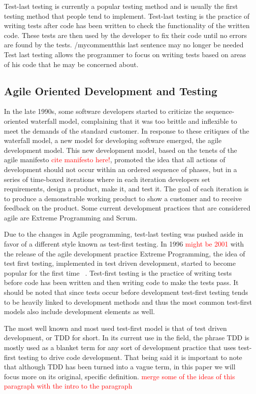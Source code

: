 \documentclass{sig-alternate}
\newcommand{\mycomment}[1]{\textcolor{red}{#1}}
\begin{document}
Test-last testing is currently a popular testing method and is usually the first testing method that people tend to implement.  Test-last testing is the practice of writing tests after code has been written to check the functionality of the written code.  These tests are then used by the developer to fix their code until no errors are found by the tests.  /mycomment{this last sentence may no longer be needed} Test last testing allows the programmer to focus on writing tests based on areas of his code that he may be concerned about.

\subsection{Agile Oriented Development and Testing}

In the late 1990s, some software developers started to criticize the sequence-oriented waterfall model, complaining that it was too brittle and inflexible to meet the demands of the standard customer.  In response to these critiques of the waterfall model, a new model for developing software emerged, the agile development model.  This new development model, based on the tenets of the agile manifesto \mycomment{cite manifesto here!}, promoted the idea that all actions of development should not occur within an ordered sequence of phases, but in a series of time-boxed iterations where in each iteration developers set requirements, design a product, make it, and test it.  The goal of each iteration is to produce a demonstrable working product to show a customer and to receive feedback on the product.  Some current development practices that are considered agile are Extreme Programming and Scrum.

Due to the changes in Agile programming, test-last testing was pushed aside in favor of a different style known as test-first testing.  In 1996 \mycomment{might be 2001} with the release of the agile development practice Extreme Programming, the idea of test first testing, implemented in test driven development, started to become popular for the first time ~\cite{Hammond:2012}. Test-first testing is the practice of writing tests before code has been written and then writing code to make the tests pass.  It should be noted that since tests occur before development test-first testing tends to be heavily linked to development methods and thus the most common test-first models also include development elements as well. 

The most well known and most used test-first model is that of test driven development, or TDD for short.  In its current use in the field, the phrase TDD is mostly used as a blanket term for any sort of development practice that uses test-first testing to drive code development. That being said it is important to note that although TDD has been turned into a vague term, in this paper we will focus more on its original, specific definition.  \mycomment{merge some of the ideas of this paragraph with the intro to the paragraph}
\end{document}
